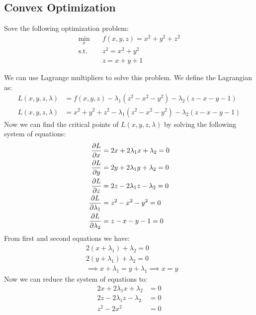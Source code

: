 \documentclass[12pt]{article}
\begin{document}
\subsection{Convex Optimization}
Sove the following optimization problem:
\begin{align*}
    \min_{x} \quad    & f(x,y,z) = x^2 + y^2 + z^2 \\
    \text{s.t.} \quad & z^2 = x^2 + y^2            \\
                      & z = x + y + 1
\end{align*}
\begin{qsolve}[solution]
    We can use Lagrange multipliers to solve this problem. We define the Lagrangian as:
    \begin{align*}
        L(x,y,z,\lambda) & = f(x,y,z) - \lambda_1(z^2 - x^2 - y^2) - \lambda_2(z - x - y - 1)        \\
        L(x,y,z,\lambda) & = x^2 + y^2 + z^2 - \lambda_1(z^2 - x^2 - y^2) - \lambda_2(z - x - y - 1)
    \end{align*}
    \splitqsolve
    Now we can find the critical points of $L(x,y,z,\lambda)$ by solving the following system of equations:
    \begin{align*}
        \pdv{L}{x}         & = 2x + 2\lambda_1x + \lambda_2 = 0 \\
        \pdv{L}{y}         & = 2y + 2\lambda_1y + \lambda_2 = 0 \\
        \pdv{L}{z}         & = 2z - 2\lambda_1z - \lambda_2 = 0 \\
        \pdv{L}{\lambda_1} & = z^2 - x^2 - y^2 = 0              \\
        \pdv{L}{\lambda_2} & = z - x - y - 1 = 0
    \end{align*}
    From first and second equations we have:
    \begin{align*}
         & 2(x + \lambda_1) + \lambda_2 = 0                      \\
         & 2(y + \lambda_1) + \lambda_2 = 0                      \\
         & \implies x + \lambda_1 = y + \lambda_1 \implies x = y
    \end{align*}
    Now we can reduce the system of equations to:
    \begin{align*}
        2x + 2\lambda_1x + \lambda_2 & = 0 \\
        2z - 2\lambda_1z - \lambda_2 & = 0 \\
        z^2 - 2x^2                   & = 0 \\

\end{align*}
\end{qsolve}
\end{document}
